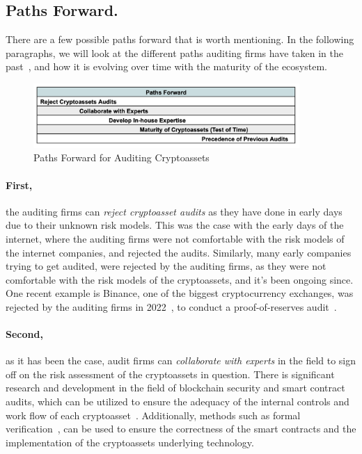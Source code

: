 \subsection{Paths Forward.} 
There are a few possible paths forward that is worth mentioning. In the following paragraphs, we will look at the different paths auditing firms have taken in the past~\cite{pimentel2020blockchain,garanina2022blockchain}, and how it is evolving over time with the maturity of the ecosystem.

\begin{figure}[t]\label{fig:pathsforward}
    \centering
    \includegraphics[width=0.9\textwidth]{figures/audit_pathsforward.png}
    \caption[Paths Forward for Auditing Cryptoassets]{Paths Forward for Auditing Cryptoassets}
\end{figure}	


\paragraph{First,} the auditing firms can \textit{reject cryptoasset audits} as they have done in early days due to their unknown risk models. This was the case with the early days of the internet, where the auditing firms were not comfortable with the risk models of the internet companies, and rejected the audits. Similarly, many early companies trying to get audited, were rejected by the auditing firms, as they were not comfortable with the risk models of the cryptoassets, and it's been ongoing since. One recent example is Binance, one of the biggest cryptocurrency exchanges, was rejected by the auditing firms in 2022~\cite{binanceauditorrejection}, to conduct a proof-of-reserves audit~\cite{dagher2015provisions}.

\paragraph{Second,} as it has been the case, audit firms can \textit{collaborate with experts} in the field to sign off on the risk assessment of the cryptoassets in question. There is significant research and development in the field of blockchain security and smart contract audits, which can be utilized to ensure the adequacy of the internal controls and work flow of each cryptoasset~\cite{krakenproofofreserve}. Additionally, methods such as formal verification~\cite{clark2018sok8}, can be used to ensure the correctness of the smart contracts and the implementation of the cryptoassets underlying technology. 

